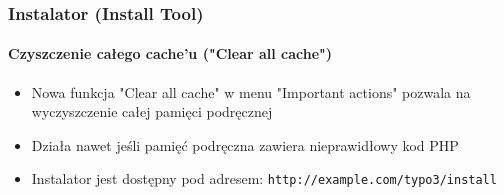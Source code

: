
\begin{frame}[fragile]
	\frametitle{Instalator (Install Tool)}
	\framesubtitle{Czyszczenie całego cache'u ("Clear all cache")}

	\begin{itemize}
		\item Nowa funkcja "Clear all cache" w menu "Important actions" pozwala na wyczyszczenie całej pamięci podręcznej
		\item Działa nawet jeśli pamięć podręczna zawiera nieprawidłowy kod PHP
		\item Instalator jest dostępny pod adresem: \texttt{http://example.com/typo3/install} 
	\end{itemize}


\end{frame}
